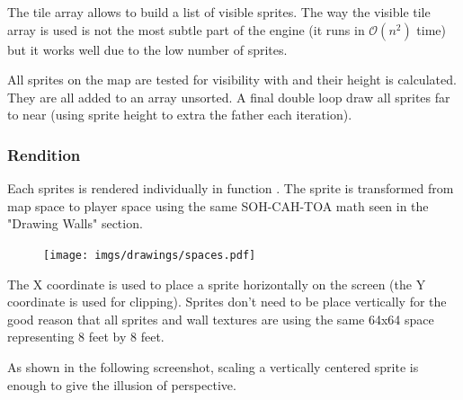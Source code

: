 The tile array allows to build a list of visible sprites. The way the visible tile array is used is not the most subtle part of the engine (it runs in $\mathcal{O}(n^2)$ time) but it works well due to the low number of sprites.\\
\par
 All sprites on the map are tested for visibility with  and their height is calculated. They are all added to an array unsorted. A final double loop draw all sprites far to near (using sprite height to extra the father each iteration).\\
\par
\begin{minipage}{\textwidth}
 
 \end{minipage}
 \par
 




\subsubsection{Rendition}
Each sprites is rendered individually in function . The sprite is transformed from map space to player space using the same SOH-CAH-TOA math seen in the "Drawing Walls" section.

\par
\begin{figure}[H]
\centering
 \texttt{[image: imgs/drawings/spaces.pdf]}
 \end{figure}
\par
The X coordinate is used to place a sprite horizontally on the screen (the Y coordinate is used for clipping). Sprites don't need to be place vertically for the good reason that all sprites and wall textures are using the same 64x64 space representing 8 feet by 8 feet.\\
\par
  \begin{minipage}{.5\textwidth}
  \end{minipage}
   \begin{minipage}{.5\textwidth} 
   \end{minipage}

\par



 As shown in the following screenshot, scaling a vertically centered sprite is enough to give the illusion of perspective.\\
\par
\begin{figure}[H]
 \centering
\end{figure}

